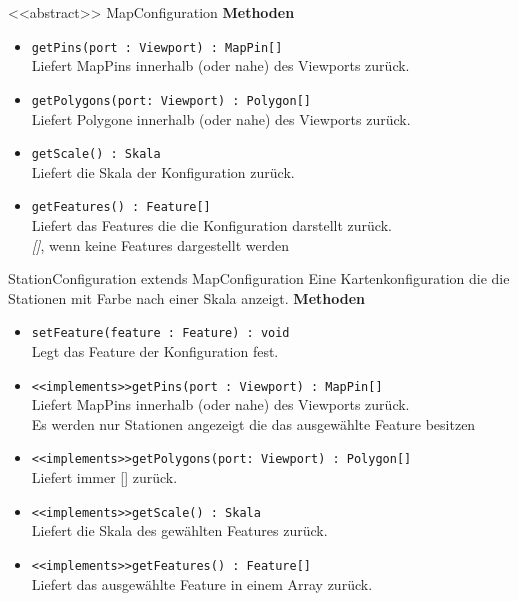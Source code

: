     \begin{Class}{<<abstract>> MapConfiguration}
        \textbf{Methoden}
        \begin{itemize}
            \item \texttt{getPins(port : Viewport) : MapPin[]}
            \\ Liefert MapPins innerhalb (oder nahe) des Viewports zurück.
            \item \texttt{getPolygons(port: Viewport) : Polygon[]}
            \\ Liefert Polygone innerhalb (oder nahe) des Viewports zurück.
            \item \texttt{getScale() : Skala}
            \\ Liefert die Skala der Konfiguration zurück.
            \item \texttt{getFeatures() : Feature[]}
            \\ Liefert das Features die die Konfiguration darstellt zurück.
            \\ \emph{[]}, wenn keine Features dargestellt werden
        \end{itemize}
    \end{Class}

    \begin{Class}{StationConfiguration extends MapConfiguration}
        Eine Kartenkonfiguration die die Stationen mit Farbe nach einer Skala anzeigt.
        \textbf{Methoden}
        \begin{itemize}
            \item \texttt{setFeature(feature : Feature) : void}
            \\ Legt das Feature der Konfiguration fest.
            \item \texttt{<<implements>>getPins(port : Viewport) : MapPin[]}
            \\ Liefert MapPins innerhalb (oder nahe) des Viewports zurück.
            \\ Es werden nur Stationen angezeigt die das ausgewählte Feature besitzen
            \item \texttt{<<implements>>getPolygons(port: Viewport) : Polygon[]}
            \\ Liefert immer [] zurück.
            \item \texttt{<<implements>>getScale() : Skala}
            \\ Liefert die Skala des gewählten Features zurück.
            \item \texttt{<<implements>>getFeatures() : Feature[]}
            \\ Liefert das ausgewählte Feature in einem Array zurück.
        \end{itemize}
    \end{Class}

